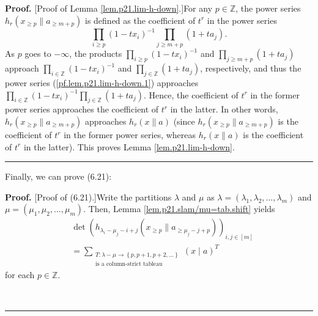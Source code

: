 \documentclass[numbers=enddot,12pt,final,onecolumn,notitlepage]{scrartcl}%
\theoremstyle{definition}
\newenvironment{proof}[1][Proof]{\noindent\textbf{#1.} }{\ \rule{0.5em}{0.5em}}
\let\sumnonlimits\sum
\let\prodnonlimits\prod
\renewcommand{\sum}{\sumnonlimits\limits}
\renewcommand{\prod}{\prodnonlimits\limits}
\begin{document}
\begin{enumerate}
\begin{proof}
[Proof of Lemma \ref{lem.p21.lim-h-down}.]For any $p\in\mathbb{Z}$, the power
series $h_{r}\left(  x_{\geq p}\parallel a_{\geq m+p}\right)  $ is defined as
the coefficient of $t^{r}$ in the power series
\begin{equation}
\prod_{i\geq p}\left(  1-tx_{i}\right)  ^{-1}\prod_{j\geq m+p}\left(
1+ta_{j}\right)  . \label{pf.lem.p21.lim-h-down.1}%
\end{equation}
As $p$ goes to $-\infty$, the products $\prod_{i\geq p}\left(  1-tx_{i}%
\right)  ^{-1}$ and $\prod_{j\geq m+p}\left(  1+ta_{j}\right)  $ approach
$\prod_{i\in\mathbb{Z}}\left(  1-tx_{i}\right)  ^{-1}$ and $\prod
_{j\in\mathbb{Z}}\left(  1+ta_{j}\right)  $, respectively, and thus the power
series (\ref{pf.lem.p21.lim-h-down.1}) approaches $\prod_{i\in\mathbb{Z}%
}\left(  1-tx_{i}\right)  ^{-1}\prod_{j\in\mathbb{Z}}\left(  1+ta_{j}\right)
$. Hence, the coefficient of $t^{r}$ in the former power series approaches the
coefficient of $t^{r}$ in the latter. In other words, $h_{r}\left(  x_{\geq
p}\parallel a_{\geq m+p}\right)  $ approaches $h_{r}\left(  x\parallel
a\right)  $ (since $h_{r}\left(  x_{\geq p}\parallel a_{\geq m+p}\right)  $ is
the coefficient of $t^{r}$ in the former power series, whereas $h_{r}\left(
x\parallel a\right)  $ is the coefficient of $t^{r}$ in the latter). This
proves Lemma \ref{lem.p21.lim-h-down}.
\end{proof}

Finally, we can prove (6.21):

\begin{proof}
[Proof of (6.21).]Write the partitions $\lambda$ and $\mu$ as $\lambda=\left(
\lambda_{1},\lambda_{2},\ldots,\lambda_{m}\right)  $ and $\mu=\left(  \mu
_{1},\mu_{2},\ldots,\mu_{m}\right)  $. Then, Lemma
\ref{lem.p21.slam/mu=tab.shift} yields%
\begin{align}
&  \det\left(  h_{\lambda_{i}-\mu_{j}-i+j}\left(  x_{\geq p}\parallel
a_{\geq\mu_{j}-j+p}\right)  \right)  _{i,j\in\left[  m\right]  }\nonumber\\
&  =\sum_{\substack{T:\lambda-\mu\rightarrow\left\{  p,p+1,p+2,\ldots\right\}
\\\text{is a column-strict tableau}}}\left(  x\mid a\right)  ^{T}
\label{p22.6.21.pf.1}%
\end{align}
for each $p\in\mathbb{Z}$.


\end{proof}
\end{enumerate}
\end{document}
